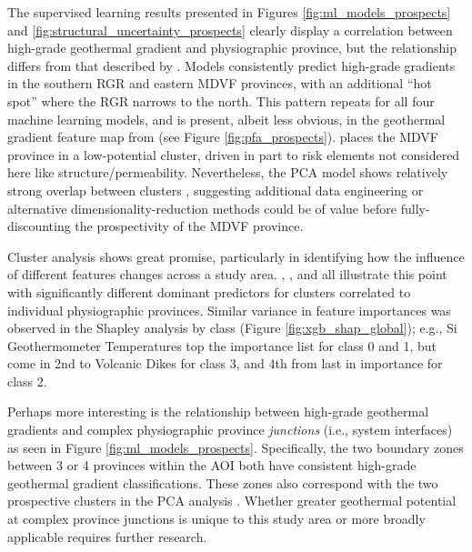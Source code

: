 The supervised learning results presented in Figures \ref{fig:ml_models_prospects} and \ref{fig:structural_uncertainty_prospects} clearly display a correlation between high-grade geothermal gradient and physiographic province, but the relationship differs from that described by \citet{pepin_new_2019}. Models consistently predict high-grade gradients in the southern RGR and eastern MDVF provinces, with an additional ``hot spot'' where the RGR narrows to the north. This pattern repeats for all four machine learning models, and is present, albeit less obvious, in the geothermal gradient feature map from \citet{bielicki_hydrogeolgic_2015} (see Figure \ref{fig:pfa_prospects}). \citet{pepin_new_2019} places the MDVF province in a low-potential cluster, driven in part to risk elements not considered here like structure/permeability. Nevertheless, the PCA model shows relatively strong overlap between clusters \citep[Figure 3.4,][]{pepin_new_2019}, suggesting additional data engineering or alternative dimensionality-reduction methods could be of value before fully-discounting the prospectivity of the MDVF province.

Cluster analysis shows great promise, particularly in identifying how the influence of different features changes across a study area. \citet{pepin_new_2019}, \citet{smith_characterizing_2021}, and \citet{vesselinov_discovering_2020} all illustrate this point with significantly different dominant predictors for clusters correlated to individual physiographic provinces. Similar variance in feature importances was observed in the Shapley analysis by class (Figure \ref{fig:xgb_shap_global}); e.g., Si Geothermometer Temperatures top the importance list for class 0 and 1, but come in 2nd to Volcanic Dikes for class 3, and 4th from last in importance for class 2.

Perhaps more interesting is the relationship between high-grade geothermal gradients and complex physiographic province \textit{junctions} (i.e., system interfaces) as seen in Figure \ref{fig:ml_models_prospects}. Specifically, the two boundary zones between 3 or 4 provinces within the AOI both have consistent high-grade geothermal gradient classifications. These zones also correspond with the two prospective clusters in the PCA analysis \citep{pepin_new_2019}. Whether greater geothermal potential at complex province junctions is unique to this study area or more broadly applicable requires further research.

